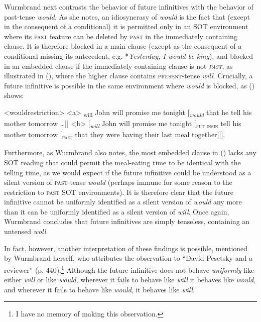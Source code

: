\documentclass[output=paper]{langscibook}
\begin{document}
Wurmbrand next contrasts the behavior of future infinitives with the behavior of past-tense \textit{would}. As she notes, an idiosyncrasy of \textit{would} is the fact that (except in the consequent of a conditional) it is permitted only in an SOT environment where its \textsc{past} feature can be deleted by \textsc{past} in the immediately containing clause. It is therefore blocked in a main clause (except as the consequent of a conditional missing its antecedent, e.g. *\textit{Yesterday, I would be king}), and blocked in an embedded clause if the immediately containing clause is not \textit{\textsc{past}}, as illustrated in (), where the higher clause contains \textsc{present}-tense \textit{will}. Crucially, a future infinitive is possible in the same environment where \textit{would} is blocked, as () shows: 

\pex<wouldrestriction>
\a<a> \ljudge{*}{[}\textsubscript{\textnormal{will}} John will promise me tonight {[}\textsubscript{\textit{would}} that he  tell his mother tomorrow \ldots {]]}
\a<b> {[}\textsubscript{\textit{will}} John will promise me tonight {[}\textsubscript{\textsc{fut infin}}  tell his mother tomorrow {[}\textsubscript{\textsc{past}} that they were having their last meal together{]]]}.
\xe

\noindent Furthermore, as Wurmbrand also notes, the most embedded clause in () lacks any SOT reading that could permit the meal-eating time to be identical with the telling time, as we would expect if the future infinitive could be understood as a silent version of \textsc{past}-tense \textit{would} (perhaps immune for some reason to the restriction to \textsc{past} SOT environments). It is therefore clear that the future infinitive cannot be uniformly identified as a silent version of \textit{would} any more than it can be uniformly identified as a silent version of \textit{will}. Once again, Wurmbrand concludes that future infinitives are simply tenseless, containing an untensed \textit{woll}. 

In fact, however, another interpretation of these findings is possible, mentioned by Wurmbrand herself, who attributes the observation to “David Pesetsky and a reviewer” (p. 440).\footnote{I have no memory of making this observation.} Although the future infinitive does not behave \textit{uniformly} like either \textit{will} or like \textit{would}, wherever it fails to behave like \textit{will} it behaves like \textit{would}, and wherever it fails to behave like \textit{would}, it behaves like \textit{will}. 
\end{document}

